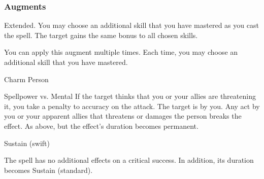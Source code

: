 \subsubsection{Augments}
 Extended.
You may choose an additional skill that you have mastered as you cast the spell.
The target gains the same bonus to all chosen skills.
\par You can apply this augment multiple times.
Each time, you may choose an additional skill that you have mastered.
\begin{spellsection}{Charm Person}
\begin{spellheader}
\end{spellheader}
\begin{spellcontent}
\begin{spelltargetinginfo}
\end{spelltargetinginfo}
\begin{spelleffects}
\begin{spellattack}{Spellpower vs. Mental}
\spellspecial If the target thinks that you or your allies are threatening it, you take a  penalty to accuracy on the attack.
\spellsuccess
The target is \charmed by you.
Any act by you or your apparent allies that threatens or damages the  person breaks the effect.
\spellcritical As above, but the effect's duration becomes permanent.
\end{spellattack}
\spelldur Sustain (swift)
\end{spelleffects}
\end{spellcontent}
\begin{spellfooter}
\miscastexplode
\end{spellfooter}
\begin{spellcantrip}
The spell has no additional effects on a critical success.
In addition, its duration becomes Sustain (standard).
\end{spellcantrip}
\end{spellsection}
